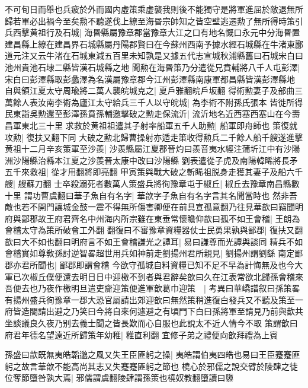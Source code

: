 不可旬日而舉也兵疲於外而國内虛策乘虚襲我則後不能獨守是將軍進屈於敵退無所歸若軍必出禍今至矣勲不聽遂伐上繚至海昬宗帥知之皆空壁逃遷勲了無所得時策引兵西擊黄祖行及石城|{
	海昬縣屬豫章郡當豫章大江之口有地名慨口永元中分海昬置建昌縣上繚在建昌界石城縣屬丹陽郡賢曰在今蘇州西南予據水經石城縣在牛渚東酈道元注又云牛渚在石城東減五百里未知孰是又據五代志宣城秋浦縣舊曰石城宋白曰池州貴池石埭二縣皆漢石城縣之地}
聞勲在海昬策乃分遣從兄賁輔將八千人屯彭澤|{
	宋白曰彭澤縣取彭蠡澤為名漢屬豫章郡今江州彭澤縣南康軍都昌縣皆漢彭澤縣地}
自與領江夏太守周瑜將二萬人襲皖城克之|{
	夏戶雅翻皖戶坂翻}
得術勲妻子及部曲三萬餘人表汝南李術為廬江太守給兵三千人以守皖城|{
	為李術不附孫氏張本}
皆徙所得民東詣吳勲還至彭澤孫賁孫輔邀擊破之勲走保流沂|{
	流沂地名近西塞西塞山在今壽昌軍東北三十里}
求救於黄祖祖遣其子射率船軍五千人助勲|{
	船軍即舟師也}
策復就攻勲|{
	復扶又翻下同}
大破之勲北歸曹操射亦遁走策收得勲兵二千餘人船千艘遂進擊黄祖十二月辛亥策軍至沙羨|{
	沙羨縣屬江夏郡晉灼曰羨音夷水經注蒲圻江中有沙陽洲沙陽縣治縣本江夏之沙羨晉太康中改曰沙陽縣}
劉表遣從子虎及南陽韓睎將長矛五千來救祖|{
	從才用翻將即亮翻}
甲寅策與戰大破之斬睎祖脱身走獲其妻子及船六千艘|{
	艘蘇刀翻}
士卒殺溺死者數萬人策盛兵將徇豫章屯于椒丘|{
	椒丘去豫章南昌縣數十里}
謂功曹虞翻曰華子魚自有名字|{
	華歆字子魚自有名字言其名聞當時也}
然非吾敵也若不開門讓城金鼓一震不得無所傷害卿便在前具宣孤意翻乃往見華歆曰竊聞明府與鄙郡故王府君齊名中州海内所宗雖在東垂常懷瞻仰歆曰孤不如王會稽|{
	王朗為會稽太守為策所破會工外翻}
翻復曰不審豫章資糧器仗士民勇果孰與鄙郡|{
	復扶又翻}
歆曰大不如也翻曰明府言不如王會稽謙光之譚耳|{
	易曰謙尊而光譚與談同}
精兵不如會稽實如尊敎孫討逆智畧超世用兵如神前走劉揚州君所親見|{
	劉揚州謂劉繇}
南定鄙郡亦君所聞也|{
	鄙郡即謂會稽}
今欲守孤城自料資糧已知不足不早為計悔無及也今大軍已次椒丘僕便還去明日日中迎檄不到者與君辭矣歆曰久在江表常欲北歸孫會稽來吾便去也乃夜作檄明旦遣吏齎迎策便進軍歆葛巾迎策　|{
	考異曰華嶠譜叙曰孫策畧有揚州盛兵徇豫章一郡大恐官屬請出郊迎歆曰無然策稍進復白發兵又不聽及策至一府皆造閤請出避之乃笑曰今將自來何遽避之有頃門下白曰孫將軍至請見乃前與歆共坐談議良久夜乃别去義士聞之皆長歎而心自服也此說太不近人情今不取}
策謂歆曰府君年德名望遠近所歸策年幼稚|{
	稚直利翻}
宜修子弟之禮便向歆拜禮為上賓

孫盛曰歆既無夷皓韜邈之風又失王臣匪躬之操|{
	夷皓謂伯夷四皓也易曰王臣蹇蹇匪躬之故言華歆不能高尚其志又失蹇蹇匪躬之節也}
橈心於邪儒之說交臂於陵肆之徒位奪節墮咎孰大焉|{
	邪儒謂虞翻陵肆謂孫策也橈奴教翻墮讀曰隳}


